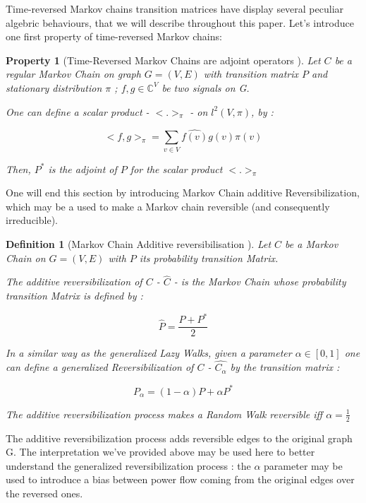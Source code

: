 \documentclass{article}
\newtheorem{propriete}{Property}[section]
\newtheorem{definition}{Definition}[section]
\begin{document}
Time-reversed Markov chains transition matrices have display several peculiar algebric behaviours, that we will describe throughout this paper. Let's introduce one first property of time-reversed Markov chains:

\begin{propriete}[Time-Reversed Markov Chains are adjoint operators \cite{sevi2019}]
    Let $C$ be a regular Markov Chain on graph $G=(V,E)$ with transition matrix $P$ and stationary distribution $\pi$ ; $f, g \in \mathbb{C}^{V}$ be two signals on G.
    
    One can define a scalar product - $<.>_{\pi}$ - on $l^2(V, \pi)$, by : 
    
    \begin{equation}
        <f,g>_{\pi} = \sum_{v \in V} \hat{f(v)}g(v)\pi(v)
    \end{equation}

Then, $P^*$ is the adjoint of $P$ for the scalar product $<.>_{\pi}$

\end{propriete}

One will end this section by introducing Markov Chain additive Reversibilization, which may be a used to make a Markov chain reversible (and consequently irreducible).

\begin{definition}[Markov Chain Additive reversibilisation \cite{sevi2019}]
Let $C$ be a Markov Chain on $G=(V,E)$ with $P$ its probability transition Matrix. 

The additive reversibilization of $C$ - $\hat{C}$ - is the Markov Chain whose probability transition Matrix is defined by :

\begin{equation}
    \hat{P} = \frac{P + P^*}{2}
\end{equation}

In a similar way as the generalized Lazy Walks, given a parameter $\alpha \in [0,1]$ one can define a generalized Reversibilization of $C$ - $\hat{C_\alpha}$ by the transition matrix :

\begin{equation}
    \hat{P_\alpha} = (1-\alpha) P + \alpha P^*
\end{equation}

The additive reversibilization process makes a Random Walk reversible iff $\alpha = \frac{1}{2}$

\end{definition}

The additive reversibilization process adds reversible edges to the original graph G. The interpretation we've provided above may be used here to better understand the generalized reversibilization process : the $\alpha$ parameter may be used to introduce a bias between power flow coming from the original edges over the reversed ones. 
\end{document}
